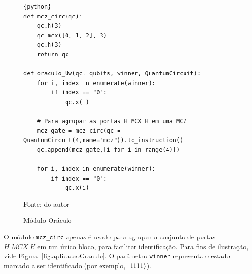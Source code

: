 \begin{figure}[!thb]
\centering
\caption{Módulo Oráculo} 
\begin{lstlisting}{python}
def mcz_circ(qc):
    qc.h(3)
    qc.mcx([0, 1, 2], 3)
    qc.h(3)
    return qc
    
def oraculo_Uw(qc, qubits, winner, QuantumCircuit):
    for i, index in enumerate(winner):
        if index == "0":
            qc.x(i)

    # Para agrupar as portas H MCX H em uma MCZ
    mcz_gate = mcz_circ(qc = QuantumCircuit(4,name="mcz")).to_instruction() 
    qc.append(mcz_gate,[i for i in range(4)])

    for i, index in enumerate(winner):
        if index == "0":
            qc.x(i)
\end{lstlisting} 
{\small Fonte: do autor} 
\label{cod:oraculo} 
\end{figure}

O módulo \verb|mcz_circ| apenas é usado para agrupar o conjunto de portas $H~MCX~H$ em um único bloco, para facilitar identificação. Para fins de ilustração, vide Figura~\ref{fig:aplicacaoOraculo}. O parâmetro \texttt{winner} representa o estado marcado a ser identificado (por exemplo, $\ket{1111}$).

